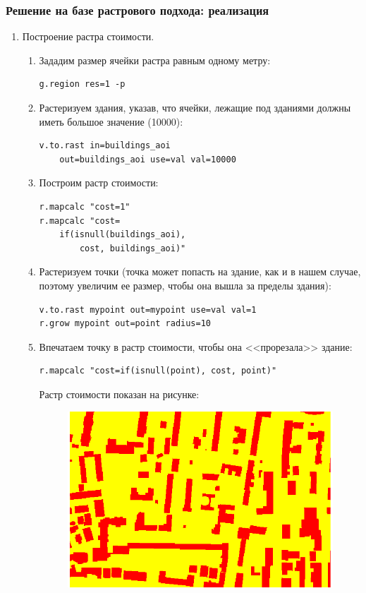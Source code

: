 \begin{frame}
    \frametitle{Решение на базе растрового подхода: реализация}
    \begin{enumerate}
        \item Построение растра стоимости.
        \begin{enumerate}
            \item Зададим размер ячейки растра равным одному метру:
            \begin{verbatim}
g.region res=1 -p
            \end{verbatim}
            \item Растеризуем здания, указав, что ячейки, лежащие под зданиями должны иметь большое значение (10000):
            \begin{verbatim}
v.to.rast in=buildings_aoi
    out=buildings_aoi use=val val=10000
            \end{verbatim}
            \item Построим растр стоимости:
            \begin{verbatim}
r.mapcalc "cost=1"
r.mapcalc "cost=
    if(isnull(buildings_aoi),
        cost, buildings_aoi)"
            \end{verbatim}
            \item Растеризуем точки (точка может попасть на здание, как и в нашем случае, поэтому увеличим ее размер, чтобы она вышла за пределы здания):
            \begin{verbatim}
v.to.rast mypoint out=mypoint use=val val=1
r.grow mypoint out=point radius=10
            \end{verbatim}
            \item Впечатаем точку в растр стоимости, чтобы она <<прорезала>> здание:
            \begin{verbatim}
r.mapcalc "cost=if(isnull(point), cost, point)"
            \end{verbatim}
            Растр стоимости показан на рисунке:
            \begin{figure}[!ht]
                \begin{center}
                    \includegraphics[width=0.8\columnwidth]{./practic/img/cost}

\end{center}
\end{figure}
\end{enumerate}
\end{enumerate}
\end{frame}
